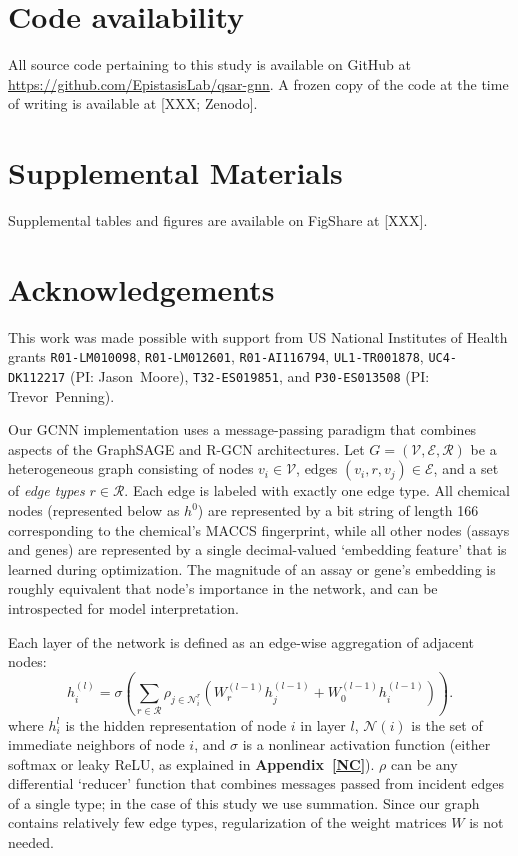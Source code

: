 \documentclass{ws-procs11x85}
\begin{document}
\section{Code availability}
All source code pertaining to this study is available on GitHub at \url{https://github.com/EpistasisLab/qsar-gnn}.
A frozen copy of the code at the time of writing is available at [XXX; Zenodo].

\section{Supplemental Materials}
Supplemental tables and figures are available on FigShare at [XXX].

\section*{Acknowledgements}
This work was made possible with support from US National Institutes of Health grants \texttt{R01-LM010098}, \texttt{R01-LM012601}, \texttt{R01-AI116794}, \texttt{UL1-TR001878}, \texttt{UC4-DK112217} (PI: Jason~Moore), \texttt{T32-ES019851}, and \texttt{P30-ES013508} (PI: Trevor~Penning).

\label{GCNN}
Our GCNN implementation uses a message-passing paradigm that combines aspects of the GraphSAGE and R-GCN architectures.
Let $G = (\mathcal{V}, \mathcal{E}, \mathcal{R})$ be a heterogeneous graph consisting of nodes $v_i \in \mathcal{V}$, edges $(v_i, r, v_j)\in\mathcal{E}$, and a set of \textit{edge types} $r\in\mathcal{R}$.
Each edge is labeled with exactly one edge type.
All chemical nodes (represented below as $h^0$) are represented by a bit string of length 166 corresponding to the chemical's MACCS fingerprint, while all other nodes (assays and genes) are represented by a single decimal-valued `embedding feature' that is learned during optimization.
The magnitude of an assay or gene's embedding is roughly equivalent that node's importance in the network, and can be introspected for model interpretation.

Each layer of the network is defined as an edge-wise aggregation of adjacent nodes:
\begin{equation}
   h_i^{(l)} = \sigma \left(\sum_{r\in\mathcal{R}}\rho_{j\in\mathcal{N}_i^r}\left(W_r^{(l-1)} h_j^{(l-1)} + W_0^{(l-1)} h_i^{(l-1)}\right) \right).\label{eq:a1}
\end{equation}
where $h_i^l$ is the hidden representation of node $i$ in layer $l$, $\mathcal{N}(i)$ is the set of immediate neighbors of node $i$, and $\sigma$ is a nonlinear activation function (either softmax or leaky ReLU, as explained in \textbf{Appendix~\ref{NC}}).
$\rho$ can be any differential `reducer' function that combines messages passed from incident edges of a single type; in the case of this study we use summation.
Since our graph contains relatively few edge types, regularization of the weight matrices $W$ is not needed.
\end{document}
